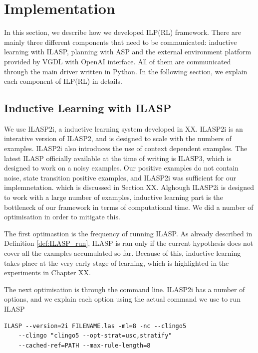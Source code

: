 \section{Implementation}
\label{Implementation}
In this section, we describe how we developed ILP(RL) framework.
There are mainly three different components that need to be communicated: inductive learning with ILASP, planning with ASP and the external environment platform provided by VGDL with OpenAI interface.
All of them are communicated through the main driver written in Python. 
In the following section, we explain each component of ILP(RL) in details.

\subsection{Inductive Learning with ILASP}
We use ILASP2i, a inductive learning system developed in XX. 
ILASP2i is an interative version of ILASP2, and is designed to scale with the numbers of examples. 
ILASP2i also introduces the use of context dependent examples.
The latest ILASP officially available at the time of writing is ILASP3, which is designed to work on a noisy examples. 
Our positive examples do not contain noise, state transition positive examples, and ILASP2i was sufficient for our implemnetation.
which is discussed in Section XX. 
Alghough ILASP2i is designed to work with a large number of examples, inductive learning part is the bottleneck of our framework in terms of computational time. 
We did a number of optimisation in order to mitigate this. 

The first optimastion is the frequency of running ILASP. 
As already described in Definition \ref{def:ILASP_run}, ILASP is ran only if the current hypothesis does not cover all the examples accumulated so far.
Because of this, inductive learning takes place at the very early stage of learning, which is highlighted in the experiments in Chapter XX. 

The next optimisation is through the command line. 
ILASP2i has a number of options, and we explain each option using the actual command we use to run ILASP


\begin{lstlisting}[]
    ILASP --version=2i FILENAME.las -ml=8 -nc --clingo5 
    --clingo "clingo5 --opt-strat=usc,stratify" 
    --cached-ref=PATH --max-rule-length=8
\end{lstlisting}

